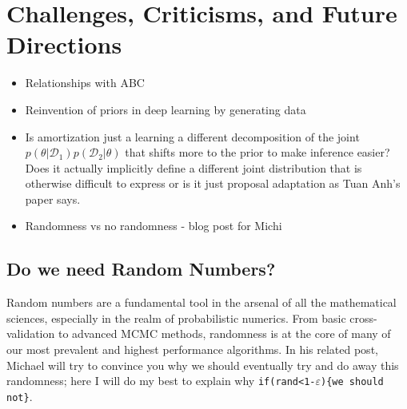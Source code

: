 
\chapter{Challenges, Criticisms, and Future Directions}
\label{chp:discussion}

\begin{itemize}
	\item Relationships with ABC
	\item Reinvention of priors in deep learning by generating data
	\item Is amortization just a learning a different decomposition of the joint 
	$p(\theta | \mathcal{D}_1)p(\mathcal{D}_2|\theta)$ that shifts more to the
	prior to make inference easier?  Does it actually implicitly define a different
	joint distribution that is otherwise difficult to express or is it just proposal
	adaptation as Tuan Anh's paper says.
	\item Randomness vs no randomness - blog post for Michi
\end{itemize}

\section{Do we need Random Numbers?}
	
Random numbers are a fundamental tool in the arsenal of all the mathematical sciences, especially in the realm of 
probabilistic numerics.  From basic cross-validation to advanced MCMC methods, randomness is at the core of 
many of our most prevalent and highest performance algorithms.  In his related post, Michael will 
try to convince you why we should eventually try and do away this randomness; here I will do my best to explain why
\texttt{if(rand<1-$\varepsilon$)\{we should not\}}.

